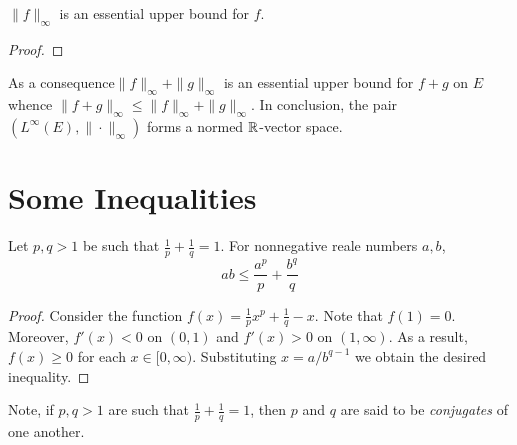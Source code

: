 \begin{lemma}
    $\|f\|_\infty$ is an essential upper bound for $f$.
\end{lemma}
\begin{proof}
\end{proof}

As a consequence$\|f\|_\infty + \|g\|_\infty$ is an essential upper bound for $f + g$ on $E$ whence $\|f + g\|_\infty\le\|f\|_\infty + \|g\|_\infty$. In conclusion, the pair $(L^\infty(E),\|\cdot\|_\infty)$ forms a normed $\mathbb{R}$-vector space.


\section{Some Inequalities}

\begin{theorem}[Young]
    Let $p,q > 1$ be such that $\frac{1}{p} + \frac{1}{q} = 1$. For nonnegative reale numbers $a,b$, 
    \begin{equation*}
        ab\le\frac{a^p}{p} + \frac{b^q}{q}
    \end{equation*}
\end{theorem}
\begin{proof}
    Consider the function $f(x) = \frac{1}{p}x^p + \frac{1}{q} - x$. Note that $f(1) = 0$. Moreover, $f'(x) < 0$ on $(0,1)$ and $f'(x) > 0$ on $(1,\infty)$. As a result, $f(x)\ge 0$ for each $x\in[0,\infty)$. Substituting $x = a/b^{q - 1}$ we obtain the desired inequality.
\end{proof}

Note, if $p,q > 1$ are such that $\frac{1}{p} + \frac{1}{q} = 1$, then $p$ and $q$ are said to be \textit{conjugates} of one another.

